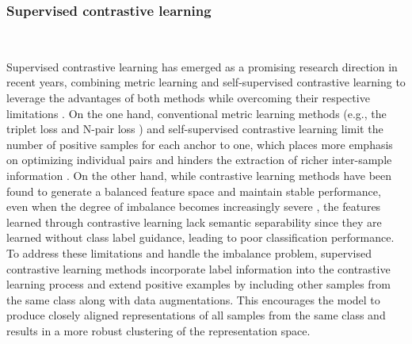 


\subsubsection{Supervised contrastive learning}\
\label{s323}

Supervised contrastive learning has emerged as a promising research direction in recent years, combining metric learning and self-supervised contrastive learning to leverage the advantages of both methods while overcoming their respective limitations \cite{khosla2020supervised}. 
On the one hand, conventional metric learning methods (e.g., the triplet loss \cite{weinberger2009distance} and N-pair loss \cite{sohn2016improved}) and self-supervised contrastive learning \cite{tian2020contrastive} limit the number of positive samples for each anchor to one, which places more emphasis on optimizing individual pairs and hinders the extraction of richer inter-sample information \cite{khosla2020supervised}. 
On the other hand, while contrastive learning methods have been found to generate a balanced feature space and maintain stable performance, even when the degree of imbalance becomes increasingly severe \cite{yang2020rethinking, kang2021exploring}, the features learned through contrastive learning lack semantic separability since they are learned without class label guidance, leading to poor classification performance. 
To address these limitations and handle the imbalance problem, supervised contrastive learning methods incorporate label information into the contrastive learning process and extend positive examples by including other samples from the same class along with data augmentations. This encourages the model to produce closely aligned representations of all samples from the same class and results in a more robust clustering of the representation space. 

